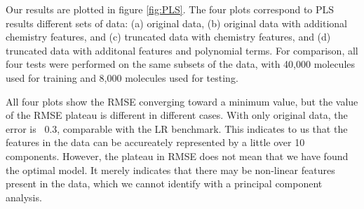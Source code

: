 \documentclass[11pt]{article}
\begin{document}
Our results are plotted in figure \ref{fig:PLS}.  The four plots correspond to PLS results different sets of data: (a) original data, (b) original data with additional chemistry features, and (c) truncated data with chemistry features, and (d) truncated data with additonal features and polynomial terms. For comparison, all four tests were performed on the same subsets of the data, with 40,000 molecules used for training and 8,000 molecules used for testing. 

All four plots show the RMSE converging toward a minimum value, but the value of the RMSE plateau is different in different cases. With only original data, the error is ~0.3, comparable with the LR benchmark. This indicates to us that the features in the data can be accureately represented by a little over 10 components. However, the plateau in RMSE does not mean that we have found the optimal model. It merely indicates that there may be non-linear features present in the data, which we cannot identify with a principal component analysis. 
\end{document}
